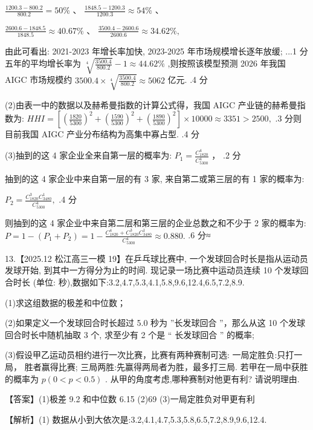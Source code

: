 \documentclass[10pt]{article}
\newcommand*\circled[1]{\tikz[baseline=(char.base)]{\node[shape=circle,draw,inner sep=1.5pt] (char) {\small #1};}}
\begin{document}
\(\frac{{1200.3} - {800.2}}{800.2} = {50}\% \text{ 、 }\frac{{1848.5} - {1200.3}}{1200.3} \approx  {54}\%\) 、

\(\frac{{2600.6} - {1848.5}}{1848.5} \approx  {40.67}\% \text{ 、 }\frac{{3500.4} - {2600.6}}{2600.6} \approx  {34.62}\% ,\)

由此可看出: 2021-2023 年增长率加快, 2023-2025 年市场规模增长逐年放缓; ...1 分五年的平均增长率为 \(\sqrt[4]{\frac{3500.4}{800.2}} - 1 \approx  {44.62}\%\) ,则按照该模型预测 2026 年我国 AIGC 市场规模约 \({3500.4} \times  \sqrt[4]{\frac{3500.4}{800.2}} \approx  {5062}\) 亿元. .4 分

(2)由表一中的数据以及赫希曼指数的计算公式得，我国 AIGC 产业链的赫希曼指数为: \({HHI} = \left\lbrack  {{\left( \frac{1820}{5300}\right) }^{2} + {\left( \frac{1590}{5300}\right) }^{2} + {\left( \frac{1890}{5300}\right) }^{2}}\right\rbrack   \times  {10000} \approx  {3351} > {2500},\) .3 分则目前我国 AIGC 产业分布结构为高集中寡占型. .4 分

(3)抽到的这 4 家企业全来自第一层的概率为: \({P}_{1} = \frac{{C}_{1820}^{4}}{{C}_{5300}^{4}}\) ， .2 分

抽到的这 4 家企业中来自第一层的有 3 家, 来自第二或第三层的有 1 家的概率为:

\({P}_{2} = \frac{{C}_{1820}^{3}{C}_{3480}^{1}}{{C}_{5300}^{4}},\) .4 分

则抽到的这 4 家企业中来自第二层和第三层的企业总数之和不少于 2 家的概率为: \(P = 1 - \left( {{P}_{1} + {P}_{2}}\right)  = 1 - \frac{{C}_{1820}^{4} + {C}_{1820}^{3}{C}_{3480}^{1}}{{C}_{5300}^{4}} \approx  {0.880}.\) .6 分≈

13.【2025.12 松江高三一模 19】在乒乓球比赛中, 一个发球回合时长是指从运动员发球开始, 到其中一方得分为止的时间. 现记录一场比赛中运动员连续 10 个发球回合时长 (单位: 秒),数据如下:3.2,4.7,5.3,4.1,5.8,9.6,12.4,6.5,7.2,8.9.

(1)求这组数据的极差和中位数；

(2)如果定义一个发球回合时长超过 5.0 秒为 ”长发球回合 ”，那么从这 10 个发球回合时长中随机抽取 3 个, 求至少有 2 个是 “ 长发球回合 ” 的概率;

(3)假设甲乙运动员相约进行一次比赛，比赛有两种赛制可选: \circled{1} 一局定胜负:只打一局， 胜者赢得比赛;  \circled{2} 三局两胜:先赢得两局者为胜，最多打三局. 若甲在一局中获胜的概率为 \(p\left( {0 < p < {0.5}}\right)\) . 从甲的角度考虑,哪种赛制对他更有利? 请说明理由.

【答案】(1)极差 9.2 和中位数 6.15 (2)69 (3)一局定胜负对甲更有利

【解析】(1) 数据从小到大依次是:3.2,4.1,4.7,5.3,5.8,6.5,7.2,8.9,9.6,12.4.
\end{document}
